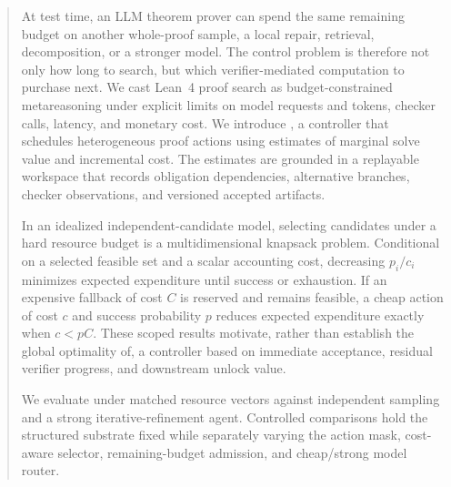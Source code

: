 \begin{abstract}
At test time, an LLM theorem prover can spend the same remaining budget on
another whole-proof sample, a local repair, retrieval, decomposition, or a
stronger model. The control problem is therefore not only how long to search,
but which verifier-mediated computation to purchase next. We cast Lean~4 proof
search as budget-constrained metareasoning under explicit limits on model
requests and tokens, checker calls, latency, and monetary cost. We introduce
\system, a controller that schedules heterogeneous proof actions using
estimates of marginal solve value and incremental cost. The estimates are
grounded in a replayable workspace that records obligation dependencies,
alternative branches, checker observations, and versioned accepted artifacts.

In an idealized independent-candidate model, selecting candidates under a hard
resource budget is a multidimensional knapsack problem. Conditional on a
selected feasible set and a scalar accounting cost, decreasing \(p_i/c_i\)
minimizes expected expenditure until success or exhaustion. If an expensive
fallback of cost \(C\) is reserved and remains feasible, a cheap action of cost
\(c\) and success probability \(p\) reduces expected expenditure exactly when
\(c<pC\). These scoped results motivate, rather than establish the global
optimality of, a controller based on immediate acceptance, residual verifier
progress, and downstream unlock value.

We evaluate \system{} under matched resource vectors against independent
sampling and a strong iterative-refinement agent. Controlled comparisons hold
the structured substrate fixed while separately varying the action mask,
cost-aware selector, remaining-budget admission, and cheap/strong model router.
\end{abstract}
